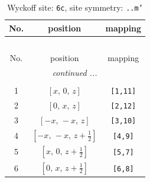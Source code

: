 \documentclass[fleqn,8pt]{jsarticle}
\begin{document}
\renewcommand{\arraystretch}{1.2}
\begin{longtable}{ccc}
\caption{Wyckoff site: {\tt 6c}, site symmetry: {\tt ..m'}}
 \\
 \hline \hline
No. & position & mapping \\ \hline \endfirsthead

\multicolumn{2}{l}{\tablename\ \thetable{}} \\
 \hline \hline
No. & position & mapping \\ \hline \endhead

 \hline \hline
\multicolumn{2}{r}{\footnotesize\it continued ...} \\ \endfoot

 \hline \hline
\multicolumn{2}{r}{} \\ \endlastfoot

1 & $\left[ x,\, 0,\, z \right]$ & {\tt [1,11]} \\ \hline
2 & $\left[ 0,\, x,\, z \right]$ & {\tt [2,12]} \\ \hline
3 & $\left[ - x,\, - x,\, z \right]$ & {\tt [3,10]} \\ \hline
4 & $\left[ - x,\, - x,\, z + \frac{1}{2} \right]$ & {\tt [4,9]} \\ \hline
5 & $\left[ x,\, 0,\, z + \frac{1}{2} \right]$ & {\tt [5,7]} \\ \hline
6 & $\left[ 0,\, x,\, z + \frac{1}{2} \right]$ & {\tt [6,8]} \\
\end{longtable}
\renewcommand{\arraystretch}{1.2}
\end{document}
